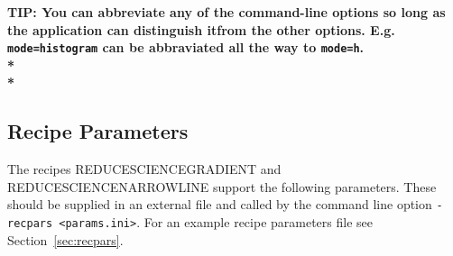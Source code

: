 \documentclass[twoside,11pt]{article}
\newcommand{\htmlref}[2]{#1}
\newcommand{\latexhtml}[2]{#1}
\newcommand{\xlabel}[1]{}
\renewcommand{\_}{\texttt{\symbol{95}}}
\newcommand{\param}[1]{\texttt{#1}}
\newcommand{\cref}[3]{\latexhtml{#1~\ref{#2}}{\htmlref{#3}{#2}}}
\begin{document}
\begin{htmlonly}
\textbf{TIP: You can abbreviate any of the command-line options so long as the application can distinguish itfrom the other options. E.g. \param{mode=histogram} can be abbraviated all the way to \param{mode=h}.\\*\\*}
\end{htmlonly}


\newpage
\subsection{\xlabel{params}Recipe Parameters}
\label{app:params}
The recipes REDUCE\_SCIENCE\_GRADIENT and REDUCE\_SCIENCE\_NARROWLINE support the following parameters. These should be supplied in an external file and called by the command line option \param{-recpars <params.ini>}. For an example recipe parameters file see \cref{Section}{sec:recpars}{Setting recipe parameters}.
\\
\end{document}
